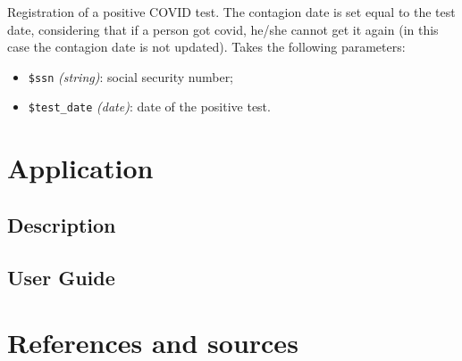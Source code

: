 \documentclass[12pt, a4paper]{article}
\begin{document}
\noindent %
Registration of a positive COVID test. The contagion date is set equal to the test date, considering that if a person got covid, he/she cannot get it again (in this case the contagion date is not updated).
Takes the following parameters: 
\begin{itemize}
    \item \texttt{\$ssn} \emph{(string)}: social security number;
    \item \texttt{\$test\_date} \emph{(date)}: date of the positive test.
\end{itemize}

\clearpage

\section{Application}

\subsection{Description}

\blindtext

\subsection{User Guide}

\blindtext

\clearpage

\section{References and sources}

\blindtext

\clearpage
\end{document}
